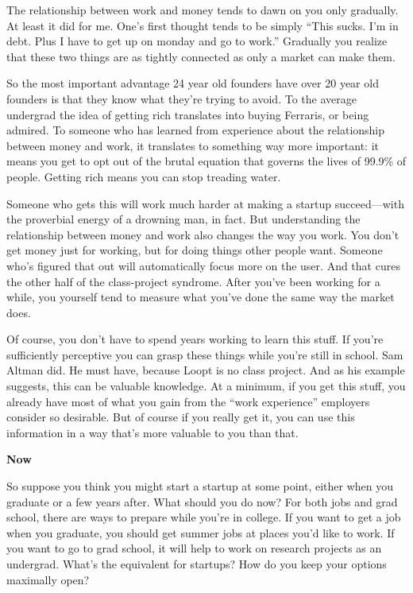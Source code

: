 The relationship between work and money tends to dawn on you only
gradually. At least it did for me. One's first thought tends to be
simply ``This sucks. I'm in debt. Plus I have to get up on monday and go
to work.'' Gradually you realize that these two things are as tightly
connected as only a market can make them.

So the most important advantage 24 year old founders have over 20 year
old founders is that they know what they're trying to avoid. To the
average undergrad the idea of getting rich translates into buying
Ferraris, or being admired. To someone who has learned from experience
about the relationship between money and work, it translates to
something way more important: it means you get to opt out of the brutal
equation that governs the lives of 99.9\% of people. Getting rich means
you can stop treading water.

Someone who gets this will work much harder at making a startup
succeed---with the proverbial energy of a drowning man, in fact. But
understanding the relationship between money and work also changes the
way you work. You don't get money just for working, but for doing things
other people want. Someone who's figured that out will automatically
focus more on the user. And that cures the other half of the
class-project syndrome. After you've been working for a while, you
yourself tend to measure what you've done the same way the market does.

Of course, you don't have to spend years working to learn this stuff. If
you're sufficiently perceptive you can grasp these things while you're
still in school. Sam Altman did. He must have, because Loopt is no class
project. And as his example suggests, this can be valuable knowledge. At
a minimum, if you get this stuff, you already have most of what you gain
from the ``work experience'' employers consider so desirable. But of
course if you really get it, you can use this information in a way
that's more valuable to you than that.

\textbf{Now}

So suppose you think you might start a startup at some point, either
when you graduate or a few years after. What should you do now? For both
jobs and grad school, there are ways to prepare while you're in college.
If you want to get a job when you graduate, you should get summer jobs
at places you'd like to work. If you want to go to grad school, it will
help to work on research projects as an undergrad. What's the equivalent
for startups? How do you keep your options maximally open?


